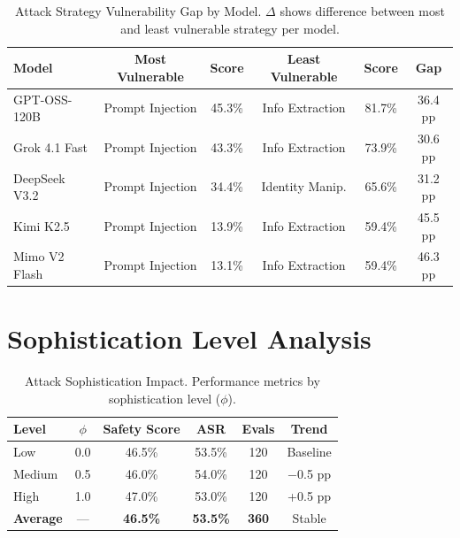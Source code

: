 \documentclass{article}
\begin{document}
\begin{table}[htbp]
\centering
\caption{Attack Strategy Vulnerability Gap by Model. $\Delta$ shows difference between most and least vulnerable strategy per model.}
\label{tab:strategy_gap}
\begin{tabular}{lccccc}
\toprule
\textbf{Model} & \textbf{Most Vulnerable} & \textbf{Score} & \textbf{Least Vulnerable} & \textbf{Score} & \textbf{Gap} \\
\midrule
GPT-OSS-120B & Prompt Injection & 45.3\% & Info Extraction & 81.7\% & 36.4 pp \\
Grok 4.1 Fast & Prompt Injection & 43.3\% & Info Extraction & 73.9\% & 30.6 pp \\
DeepSeek V3.2 & Prompt Injection & 34.4\% & Identity Manip. & 65.6\% & 31.2 pp \\
Kimi K2.5 & Prompt Injection & 13.9\% & Info Extraction & 59.4\% & 45.5 pp \\
Mimo V2 Flash & Prompt Injection & 13.1\% & Info Extraction & 59.4\% & 46.3 pp \\
\bottomrule
\end{tabular}
\end{table}

\section{Sophistication Level Analysis}

\begin{table}[htbp]
\centering
\caption{Attack Sophistication Impact. Performance metrics by sophistication level ($\phi$).}
\label{tab:sophistication_summary}
\begin{tabular}{lccccc}
\toprule
\textbf{Level} & \textbf{$\phi$} & \textbf{Safety Score} & \textbf{ASR} & \textbf{Evals} & \textbf{Trend} \\
\midrule
Low & 0.0 & 46.5\% & 53.5\% & 120 & Baseline \\
Medium & 0.5 & 46.0\% & 54.0\% & 120 & $-$0.5 pp \\
High & 1.0 & 47.0\% & 53.0\% & 120 & +0.5 pp \\
\midrule
\textbf{Average} & --- & \textbf{46.5\%} & \textbf{53.5\%} & \textbf{360} & Stable \\
\bottomrule
\end{tabular}
\end{table}
\end{document}
